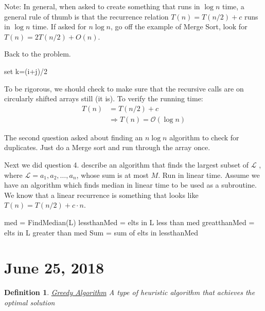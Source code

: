 \documentclass[11pt,letterpaper]{article}
\newtheorem{defn}{Definition}
\begin{document}
Note: In general, when asked to create something that runs in $\log n$ time, a general rule of thumb is that the recurrence relation $T(n) = T(n/2) + c$ runs in $\log n$ time. If asked for $n\log n$, go off the example of Merge Sort, look for $T(n) = 2T(n/2) + O(n)$. 

Back to the problem. 
\begin{algorithm}[ht]
	{set k=(i+j)/2\;
	}
	\caption{FindMax(i,j) algorithm for shifted array}
\end{algorithm}
To be rigorous, we should check to make sure that the recursive calls are on circularly shifted arrays still (it is). To verify the running time:
\begin{align*}
T(n) &= T(n/2) + c \\
&\Rightarrow T(n) = \mathcal{O}(\log n)
\end{align*}

The second question asked about finding an $n\log n$ algorithm to check for duplicates. Just do a Merge sort and run through the array once. 

Next we did question 4. describe an algorithm that finds the largest subset of $\mathcal{L}$ , where $\mathcal{L} = a_1, a_2, \ldots , a_n$, whose sum is at most $M$. Run in linear time. Assume we have an algorithm which finds median in linear time to be used as a subroutine. We know that a linear recurrence is something that looks like $T(n) = T(n/2) + c\cdot n$. 
\begin{algorithm}[ht]
	med = FindMedian(L)\;
	lessthanMed = elts in L less than med\;
	greatthanMed = elts in L greater than med\;
	Sum = sum of elts in lessthanMed\;
	\caption{FindLargestSum(L, M) algorithm which outputs size of largest subset of an array L which adds up to less than M}
\end{algorithm}

\section{June 25, 2018}
\begin{defn} 
	\underline{Greedy Algorithm} A type of heuristic algorithm that achieves the optimal solution
\end{defn}
\end{document}
